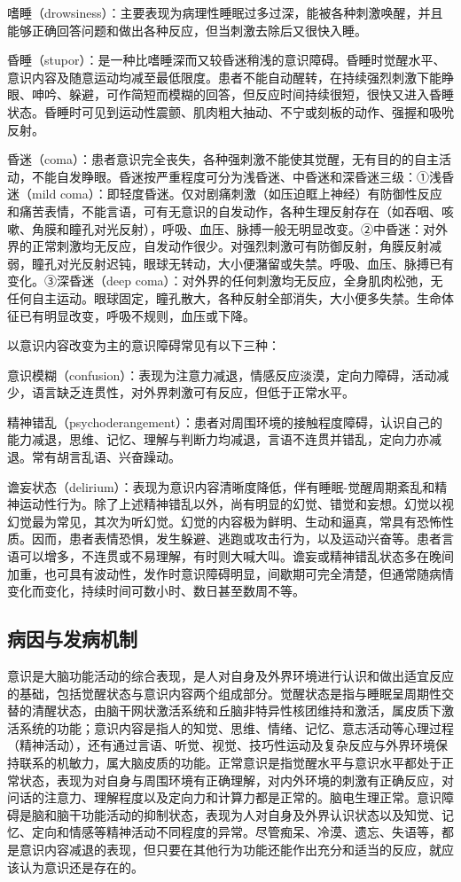 嗜睡（drowsiness）：主要表现为病理性睡眠过多过深，能被各种刺激唤醒，并且能够正确回答问题和做出各种反应，但当刺激去除后又很快入睡。

昏睡（stupor）：是一种比嗜睡深而又较昏迷稍浅的意识障碍。昏睡时觉醒水平、意识内容及随意运动均减至最低限度。患者不能自动醒转，在持续强烈刺激下能睁眼、呻吟、躲避，可作简短而模糊的回答，但反应时间持续很短，很快又进入昏睡状态。昏睡时可见到运动性震颤、肌肉粗大抽动、不宁或刻板的动作、强握和吸吮反射。

昏迷（coma）：患者意识完全丧失，各种强刺激不能使其觉醒，无有目的的自主活动，不能自发睁眼。昏迷按严重程度可分为浅昏迷、中昏迷和深昏迷三级：①浅昏迷（mild
coma）：即轻度昏迷。仅对剧痛刺激（如压迫眶上神经）有防御性反应和痛苦表情，不能言语，可有无意识的自发动作，各种生理反射存在（如吞咽、咳嗽、角膜和瞳孔对光反射），呼吸、血压、脉搏一般无明显改变。②中昏迷：对外界的正常刺激均无反应，自发动作很少。对强烈刺激可有防御反射，角膜反射减弱，瞳孔对光反射迟钝，眼球无转动，大小便潴留或失禁。呼吸、血压、脉搏已有变化。③深昏迷（deep
coma）：对外界的任何刺激均无反应，全身肌肉松弛，无任何自主运动。眼球固定，瞳孔散大，各种反射全部消失，大小便多失禁。生命体征已有明显改变，呼吸不规则，血压或下降。

以意识内容改变为主的意识障碍常见有以下三种：

意识模糊（confusion）：表现为注意力减退，情感反应淡漠，定向力障碍，活动减少，语言缺乏连贯性，对外界刺激可有反应，但低于正常水平。

精神错乱（psychoderangement）：患者对周围环境的接触程度障碍，认识自己的能力减退，思维、记忆、理解与判断力均减退，言语不连贯并错乱，定向力亦减退。常有胡言乱语、兴奋躁动。

谵妄状态（delirium）：表现为意识内容清晰度降低，伴有睡眠-觉醒周期紊乱和精神运动性行为。除了上述精神错乱以外，尚有明显的幻觉、错觉和妄想。幻觉以视幻觉最为常见，其次为听幻觉。幻觉的内容极为鲜明、生动和逼真，常具有恐怖性质。因而，患者表情恐惧，发生躲避、逃跑或攻击行为，以及运动兴奋等。患者言语可以增多，不连贯或不易理解，有时则大喊大叫。谵妄或精神错乱状态多在晚间加重，也可具有波动性，发作时意识障碍明显，间歇期可完全清楚，但通常随病情变化而变化，持续时间可数小时、数日甚至数周不等。

\subsection{病因与发病机制}

意识是大脑功能活动的综合表现，是人对自身及外界环境进行认识和做出适宜反应的基础，包括觉醒状态与意识内容两个组成部分。觉醒状态是指与睡眠呈周期性交替的清醒状态，由脑干网状激活系统和丘脑非特异性核团维持和激活，属皮质下激活系统的功能；意识内容是指人的知觉、思维、情绪、记忆、意志活动等心理过程（精神活动），还有通过言语、听觉、视觉、技巧性运动及复杂反应与外界环境保持联系的机敏力，属大脑皮质的功能。正常意识是指觉醒水平与意识水平都处于正常状态，表现为对自身与周围环境有正确理解，对内外环境的刺激有正确反应，对问话的注意力、理解程度以及定向力和计算力都是正常的。脑电生理正常。意识障碍是脑和脑干功能活动的抑制状态，表现为人对自身及外界认识状态以及知觉、记忆、定向和情感等精神活动不同程度的异常。尽管痴呆、冷漠、遗忘、失语等，都是意识内容减退的表现，但只要在其他行为功能还能作出充分和适当的反应，就应该认为意识还是存在的。

